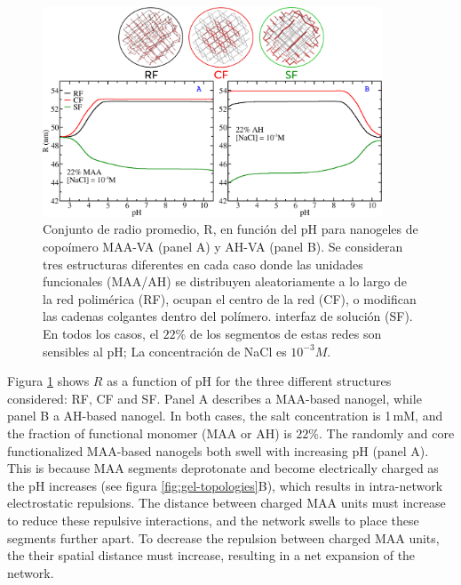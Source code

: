 \begin{figure}[!htb]
     \centering
     \includegraphics[width=0.9\textwidth]{Figures/graphs-gel2/rr.png}
     \caption{Conjunto de radio promedio, R, en funci\'on del pH para nanogeles de copo\'imero MAA-VA (panel A) y AH-VA (panel B).
     	Se consideran tres estructuras diferentes en cada caso donde las unidades funcionales (MAA/AH) se distribuyen aleatoriamente a lo largo de la red polim\'erica (RF), ocupan el centro de la red (CF), o modifican las cadenas colgantes dentro del pol\'imero. interfaz de soluci\'on (SF).
     	En todos los casos, el $22\%$ de los segmentos de estas redes son sensibles al pH; La concentraci\'on de NaCl es $10^{-3}M$.}
     \label{fig:gel-charge-MAA-AH}
\end{figure}



Figura \ref{fig:gel-charge-MAA-AH} shows $R$  as a function of  pH for the  three different structures considered: RF, CF and SF. 
Panel A describes a MAA-based nanogel, while  panel B a AH-based nanogel.
In both cases, the salt concentration is 1\,mM, and the fraction of functional monomer (MAA or AH) is  $22\%$.
The randomly and core functionalized MAA-based nanogels both swell with increasing pH (panel A).
This is because MAA segments deprotonate and become electrically charged as the pH increases (see figura \ref{fig:gel-topologies}B), which results in intra-network electrostatic repulsions.
The distance between charged MAA units must increase to reduce these repulsive interactions, and the network swells to place these segments further apart.
To decrease the repulsion between charged MAA units, the their spatial distance must increase, resulting in a net expansion of the network.



